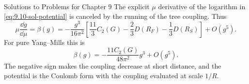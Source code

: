 \begin{bankssolutions}{Solutions to Problems for Chapter 9}
The explicit $\mu$ derivative of the logarithm in
\eqref{eq:9.10-sol-potential} is canceled by the running of the tree
coupling.  Thus
\[
 \mu\frac{\dd g}{\dd\mu}=\beta(g)
 =-\frac{g^3}{16\pi^2}\left[
 \frac{11}{3}C_2(G)-\frac{2}{3}D(R_F)-\frac{1}{3}D(R_S)\right]
 +O(g^5).
\]
For pure Yang--Mills this is
\[
 \boxed{\beta(g)=-\frac{11C_2(G)}{48\pi^2}g^3+O(g^5).}
\]
The negative sign makes the coupling decrease at short distance, and the
potential is the Coulomb form with the coupling evaluated at scale $1/R$.

\end{bankssolutions}
